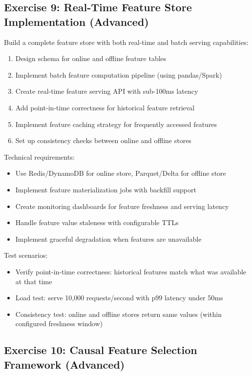 \subsection{Exercise 9: Real-Time Feature Store Implementation (Advanced)}

Build a complete feature store with both real-time and batch serving capabilities:

\begin{enumerate}
    \item Design schema for online and offline feature tables
    \item Implement batch feature computation pipeline (using pandas/Spark)
    \item Create real-time feature serving API with sub-100ms latency
    \item Add point-in-time correctness for historical feature retrieval
    \item Implement feature caching strategy for frequently accessed features
    \item Set up consistency checks between online and offline stores
\end{enumerate}

Technical requirements:
\begin{itemize}
    \item Use Redis/DynamoDB for online store, Parquet/Delta for offline store
    \item Implement feature materialization jobs with backfill support
    \item Create monitoring dashboards for feature freshness and serving latency
    \item Handle feature value staleness with configurable TTLs
    \item Implement graceful degradation when features are unavailable
\end{itemize}

Test scenarios:
\begin{itemize}
    \item Verify point-in-time correctness: historical features match what was available at that time
    \item Load test: serve 10,000 requests/second with p99 latency under 50ms
    \item Consistency test: online and offline stores return same values (within configured freshness window)
\end{itemize}

\subsection{Exercise 10: Causal Feature Selection Framework (Advanced)}

